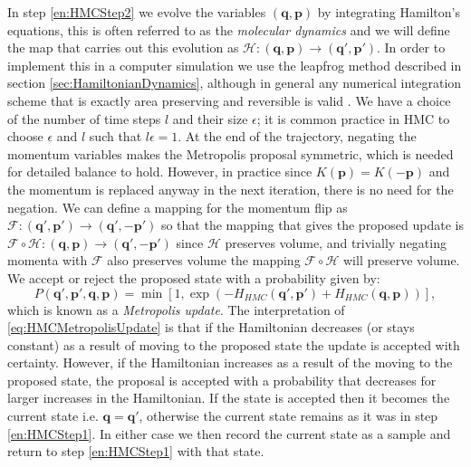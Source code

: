 \documentclass[12pt]{article}
\begin{document}
            In step \ref{en:HMCStep2} we evolve the variables $\left(\bm{q},\bm{p}\right)$ by integrating Hamilton's equations, this is often referred to as the \textit{molecular dynamics} and we will define the map that carries out this evolution as $\mathcal{H}:\left(\bm{q},\bm{p}\right)\rightarrow\left(\bm{q}',\bm{p}'\right)$. In order to implement this in a computer simulation we use the leapfrog method described in section \ref{sec:HamiltonianDynamics}, although in general any numerical integration scheme that is exactly area preserving and reversible is valid \cite{kennedy_pendleton_2001}. We have a choice of the number of time steps $l$ and their size $\epsilon$; it is common practice in HMC to choose $\epsilon$ and $l$ such that $l\epsilon=1$. At the end of the trajectory, negating the momentum variables makes the Metropolis proposal symmetric, which is needed for detailed balance to hold. However, in practice since $K\left(\bm{p}\right)=K\left(-\bm{p}\right)$ and the momentum is replaced anyway in the next iteration, there is no need for the negation. We can define a mapping for the momentum flip as $\mathcal{F}:\left(\bm{q}',\bm{p}'\right)\rightarrow\left(\bm{q}',-\bm{p}'\right)$ so that the mapping that gives the proposed update is $\mathcal{F}\circ \mathcal{H} : \left(\bm{q},\bm{p}\right)\rightarrow\left(\bm{q}',-\bm{p}'\right)$ since $\mathcal{H}$ preserves volume, and trivially negating momenta with $\mathcal{F}$ also preserves volume the mapping $\mathcal{F}\circ \mathcal{H}$ will preserve volume. We accept or reject the proposed state with a probability given by:
            \begin{equation}
                \label{eq:HMCMetropolisUpdate}
                P\left(\bm{q}',\bm{p}',\bm{q},\bm{p}\right) = \min{\left[1,\exp{\left(-H_{HMC}\left(\bm{q}',\bm{p}'\right)+ \allowbreak H_{HMC}\left(\bm{q},\bm{p}\right)\right)}\right]},
            \end{equation}
            which is known as a \textit{Metropolis update}. The interpretation of \ref{eq:HMCMetropolisUpdate} is that if the Hamiltonian decreases (or stays constant) as a result of moving to the proposed state the update is accepted with certainty. However, if the Hamiltonian increases as a result of the moving to the proposed state, the proposal is accepted with a probability that decreases for larger increases in the Hamiltonian. If the state is accepted then it becomes the current state i.e. $\bm{q} = \bm{q}'$, otherwise the current state remains as it was in step \ref{en:HMCStep1}. In either case we then record the current state as a sample and return to step \ref{en:HMCStep1} with that state.
\end{document}
